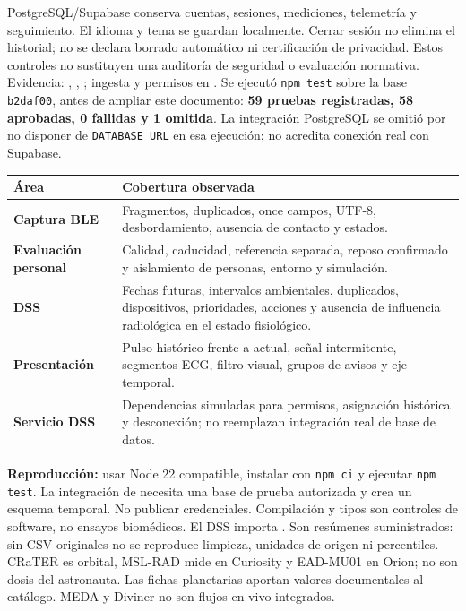 PostgreSQL/Supabase conserva cuentas, sesiones, mediciones, telemetría y seguimiento. El idioma y tema se guardan localmente. Cerrar sesión no elimina el historial; no se declara borrado automático ni certificación de privacidad. Estos controles no sustituyen una auditoría de seguridad o evaluación normativa.
\vfill
{\footnotesize\color{muted}Evidencia: , , ; ingesta y permisos en .}
\newpage
{}
Se ejecutó \texttt{npm test} sobre la base \texttt{b2daf00}, antes de ampliar este documento: \textbf{59 pruebas registradas, 58 aprobadas, 0 fallidas y 1 omitida}. La integración PostgreSQL se omitió por no disponer de \texttt{DATABASE\_URL} en esa ejecución; no acredita conexión real con Supabase.
\par\noindent\begin{tabularx}{\linewidth}{@{}>{\bfseries}p{35mm}X@{}}
\toprule Área & Cobertura observada\\\midrule
Captura BLE & Fragmentos, duplicados, once campos, UTF-8, desbordamiento, ausencia de contacto y estados.\\[6pt]
Evaluación personal & Calidad, caducidad, referencia separada, reposo confirmado y aislamiento de personas, entorno y simulación.\\[6pt]
DSS & Fechas futuras, intervalos ambientales, duplicados, dispositivos, prioridades, acciones y ausencia de influencia radiológica en el estado fisiológico.\\[6pt]
Presentación & Pulso histórico frente a actual, señal intermitente, segmentos ECG, filtro visual, grupos de avisos y eje temporal.\\[6pt]
Servicio DSS & Dependencias simuladas para permisos, asignación histórica y desconexión; no reemplazan integración real de base de datos.\\\bottomrule
\end{tabularx}\par
\textbf{Reproducción:} usar Node 22 compatible, instalar con \texttt{npm ci} y ejecutar \texttt{npm test}. La integración de  necesita una base de prueba autorizada y crea un esquema temporal. No publicar credenciales. Compilación y tipos son controles de software, no ensayos biomédicos.
El DSS importa . Son resúmenes suministrados: sin CSV originales no se reproduce limpieza, unidades de origen ni percentiles. CRaTER es orbital, MSL-RAD mide en Curiosity y EAD-MU01 en Orion; no son dosis del astronauta. Las fichas planetarias aportan valores documentales al catálogo. MEDA y Diviner no son flujos en vivo integrados.

